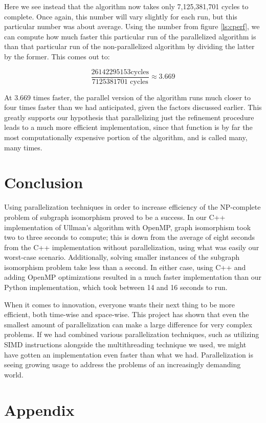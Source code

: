 \documentclass{article}
\begin{document}
  Here we see instead that the algorithm now takes only 7,125,381,701 cycles to complete. Once again, this number will vary slightly for each run, but this particular number was about average. Using the number from figure \ref{ls:cperf}, we can compute how much faster this particular run of the parallelized algorithm is than that particular run of the non-parallelized algorithm by dividing the latter by the former. This comes out to:

  \[ \frac{26142295153 \mathrm{ cycles}}{7125381701 \textrm{ cycles}} \approx 3.669 \]

  At 3.669 times faster, the parallel version of the algorithm runs much closer to four times faster than we had anticipated, given the factors discussed earlier. This greatly supports our hypothesis that parallelizing just the refinement procedure leads to a much more efficient implementation, since that function is by far the most computationally expensive portion of the algorithm, and is called many, many times.

\section{Conclusion}
  Using parallelization techniques in order to increase efficiency of the NP-complete problem of subgraph isomorphism proved to be a success. In our C++ implementation of Ullman's algorithm with OpenMP, graph isomorphism took two to three seconds to compute; this is down from the average of eight seconds from the C++ implementation without parallelization, using what was easily our worst-case scenario. Additionally, solving smaller instances of the subgraph isomorphism problem take less than a second. In either case, using C++ and adding OpenMP optimizations resulted in a much faster implementation than our Python implementation, which took between 14 and 16 seconds to run. 
  
  When it comes to innovation, everyone wants their next thing to be more efficient, both time-wise and space-wise. This project has shown that even the smallest amount of parallelization can make a large difference for very complex problems. If we had combined various parallelization techniques, such as utilizing SIMD instructions alongside the multithreading technique we used, we might have gotten an implementation even faster than what we had. Parallelization is seeing growing usage to address the problems of an increasingly demanding world.

\section{Appendix}
\end{document}

